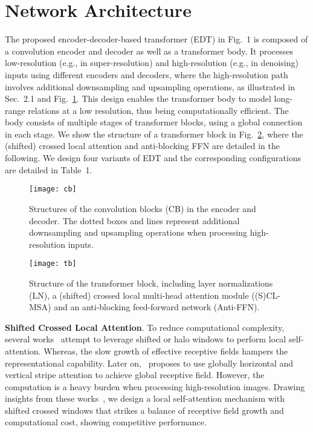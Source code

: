 \documentclass[runningheads]{llncs}
\makeatletter
\newcommand*{\eg}{e.g.\@\xspace}
\makeatother
\begin{document}
	\section{Network Architecture}
	
	The proposed encoder-decoder-based transformer (EDT) in Fig.~{1} is composed of a convolution encoder and decoder as well as a transformer body. It processes low-resolution (\eg, in super-resolution) and high-resolution (\eg, in denoising) inputs using different encoders and decoders, where the high-resolution path involves additional downsampling and upsampling operations, as illustrated in Sec.~{2.1} and Fig.~\ref{fig:cb}. This design enables the transformer body to model long-range relations at a low resolution, thus being computationally efficient. The body consists of multiple stages of transformer blocks, using a global connection in each stage. We show the structure of a transformer block in Fig.~\ref{fig:tb}, where the (shifted) crossed local attention and anti-blocking FFN are detailed in the following. We design four variants of EDT and the corresponding configurations are detailed in Table~{1}. 
	
	\begin{figure}[h]
		\begin{center}
			\texttt{[image: cb]}
		\end{center}
\caption{Structures of the convolution blocks (CB) in the encoder and decoder. The dotted boxes and lines represent additional downsampling and upsampling operations when processing high-resolution inputs.}
		\label{fig:cb}
		
	\end{figure}
	
	\begin{figure}[t]
		\begin{center}
			\texttt{[image: tb]}
		\end{center}
\caption{Structure of the transformer block, including layer normalizations (LN), a (shifted) crossed local multi-head attention module ((S)CL-MSA) and an anti-blocking feed-forward network (Anti-FFN).}
		\label{fig:tb}
\end{figure}
	
	\vspace{0.05in}
	\noindent\textbf{Shifted Crossed Local Attention}.
	To reduce computational complexity, several works~\cite{liu2021Swin,vaswani2021scaling} attempt to leverage shifted or halo windows to perform local self-attention. Whereas, the slow growth of effective receptive fields hampers the representational capability. Later on,~\cite{dong2021cswin} proposes to use globally horizontal and vertical stripe attention to achieve global receptive field. However, the computation is a heavy burden when processing high-resolution images. Drawing insights from these works~\cite{liu2021Swin,dong2021cswin}, we design a local self-attention mechanism with shifted crossed windows that strikes a balance of receptive field growth and computational cost, showing competitive performance.
	
\end{document}
